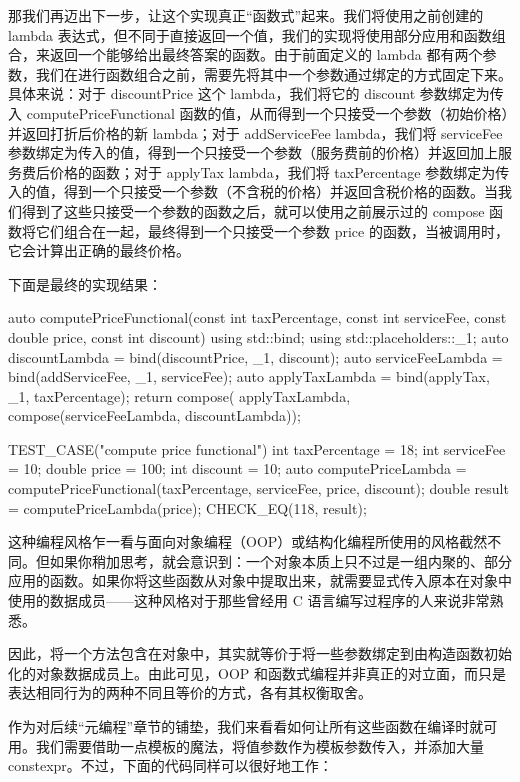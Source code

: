 那我们再迈出下一步，让这个实现真正“函数式”起来。我们将使用之前创建的 lambda 表达式，但不同于直接返回一个值，我们的实现将使用部分应用和函数组合，来返回一个能够给出最终答案的函数。由于前面定义的 lambda 都有两个参数，我们在进行函数组合之前，需要先将其中一个参数通过绑定的方式固定下来。具体来说：对于 discountPrice 这个 lambda，我们将它的 discount 参数绑定为传入 computePriceFunctional 函数的值，从而得到一个只接受一个参数（初始价格）并返回打折后价格的新 lambda；对于 addServiceFee lambda，我们将 serviceFee 参数绑定为传入的值，得到一个只接受一个参数（服务费前的价格）并返回加上服务费后价格的函数；对于 applyTax lambda，我们将 taxPercentage 参数绑定为传入的值，得到一个只接受一个参数（不含税的价格）并返回含税价格的函数。当我们得到了这些只接受一个参数的函数之后，就可以使用之前展示过的 compose 函数将它们组合在一起，最终得到一个只接受一个参数 price 的函数，当被调用时，它会计算出正确的最终价格。

下面是最终的实现结果：

\begin{cpp}
auto computePriceFunctional(const int taxPercentage, const int
serviceFee, const double price, const int discount){
  using std::bind;
  using std::placeholders::_1;
  auto discountLambda = bind(discountPrice, _1, discount);
  auto serviceFeeLambda = bind(addServiceFee, _1, serviceFee);
  auto applyTaxLambda = bind(applyTax, _1, taxPercentage);
  return compose( applyTaxLambda, compose(serviceFeeLambda,
  discountLambda));
}

TEST_CASE("compute price functional"){
  int taxPercentage = 18;
  int serviceFee = 10;
  double price = 100;
  int discount = 10;
  auto computePriceLambda = computePriceFunctional(taxPercentage,
  serviceFee, price, discount);
  double result = computePriceLambda(price);
  CHECK_EQ(118, result);
}
\end{cpp}

这种编程风格乍一看与面向对象编程（OOP）或结构化编程所使用的风格截然不同。但如果你稍加思考，就会意识到：一个对象本质上只不过是一组内聚的、部分应用的函数。如果你将这些函数从对象中提取出来，就需要显式传入原本在对象中使用的数据成员——这种风格对于那些曾经用 C 语言编写过程序的人来说非常熟悉。

因此，将一个方法包含在对象中，其实就等价于将一些参数绑定到由构造函数初始化的对象数据成员上。由此可见，OOP 和函数式编程并非真正的对立面，而只是表达相同行为的两种不同且等价的方式，各有其权衡取舍。

作为对后续“元编程”章节的铺垫，我们来看看如何让所有这些函数在编译时就可用。我们需要借助一点模板的魔法，将值参数作为模板参数传入，并添加大量 constexpr。不过，下面的代码同样可以很好地工作：

